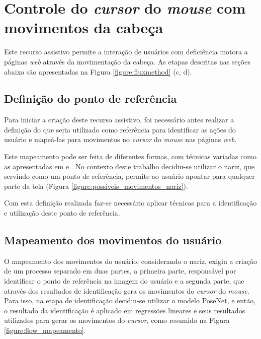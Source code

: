 \section{Controle do \textit{cursor} do \textit{mouse} com movimentos da cabeça}

\par Este recurso assistivo permite a interação de usuários com deficiência motora a páginas \textit{web} através da movimentação da cabeça. As etapas descritas nas seções abaixo são apresentadas na Figura \ref{figure:fluxmethod} (c, d).

\subsection{Definição do ponto de referência}

\par Para iniciar a criação deste recurso assistivo, foi necessário antes realizar a definição do que seria utilizado como referência para identificar as ações do usuário e mapeá-las para movimentos no \textit{cursor} do \textit{mouse} nas páginas \textit{web}.

\par Este mapeamento pode ser feita de diferentes formas, com técnicas variadas como as apresentadas em  e . No contexto deste trabalho decidiu-se utilizar o nariz, que servindo como um ponto de referência, permite ao usuário apontar para qualquer parte da tela (Figura \ref{figure:possiveis_movimentos_nariz}).


\par Com esta definição realizada faz-se necessário aplicar técnicas para a identificação e utilização deste ponto de referência. 

\subsection{Mapeamento dos movimentos do usuário}

\par O mapeamento dos movimentos do usuário, considerando o nariz, exigiu a criação de um processo separado em duas partes, a primeira parte, responsável por identificar o ponto de referência na imagem do usuário e a segunda parte, que através dos resultados de identificação gera os movimentos do \textit{cursor} do \textit{mouse}. Para isso, na etapa de identificação decidiu-se utilizar o modelo PoseNet, e então, o resultado da identificação é aplicado em regressões lineares e seus resultados utilizados para gerar os movimentos do \textit{cursor}, como resumido na Figura \ref{figure:flow_mapeamento}.

